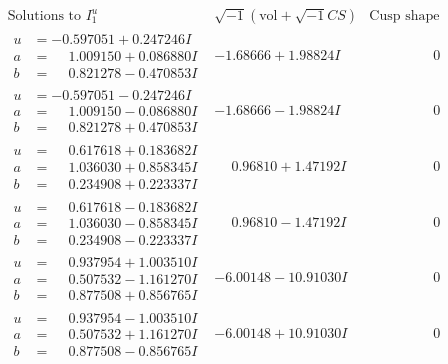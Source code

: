 \documentclass[1p]{elsarticle_modified}
\theoremstyle{definition}
\newcommand{\I}{\sqrt{-1}}
\begin{document}
$$\begin{array}{c|c|c}
\text{Solutions to }I^u_{1}& \I (\text{vol} + \sqrt{-1}CS) & \text{Cusp shape}\\
 \hline 
\begin{aligned}
u &= -0.597051 + 0.247246 I \\
a &= \phantom{-}1.009150 + 0.086880 I \\
b &= \phantom{-}0.821278 - 0.470853 I\end{aligned}
 & -1.68666 + 1.98824 I & \phantom{-0.000000 } 0 \\ \hline\begin{aligned}
u &= -0.597051 - 0.247246 I \\
a &= \phantom{-}1.009150 - 0.086880 I \\
b &= \phantom{-}0.821278 + 0.470853 I\end{aligned}
 & -1.68666 - 1.98824 I & \phantom{-0.000000 } 0 \\ \hline\begin{aligned}
u &= \phantom{-}0.617618 + 0.183682 I \\
a &= \phantom{-}1.036030 + 0.858345 I \\
b &= \phantom{-}0.234908 + 0.223337 I\end{aligned}
 & \phantom{-}0.96810 + 1.47192 I & \phantom{-0.000000 } 0 \\ \hline\begin{aligned}
u &= \phantom{-}0.617618 - 0.183682 I \\
a &= \phantom{-}1.036030 - 0.858345 I \\
b &= \phantom{-}0.234908 - 0.223337 I\end{aligned}
 & \phantom{-}0.96810 - 1.47192 I & \phantom{-0.000000 } 0 \\ \hline\begin{aligned}
u &= \phantom{-}0.937954 + 1.003510 I \\
a &= \phantom{-}0.507532 - 1.161270 I \\
b &= \phantom{-}0.877508 + 0.856765 I\end{aligned}
 & -6.00148 - 10.91030 I & \phantom{-0.000000 } 0 \\ \hline\begin{aligned}
u &= \phantom{-}0.937954 - 1.003510 I \\
a &= \phantom{-}0.507532 + 1.161270 I \\
b &= \phantom{-}0.877508 - 0.856765 I\end{aligned}
 & -6.00148 + 10.91030 I & \phantom{-0.000000 } 0 \\ \hline\begin{aligned}

\end{aligned}
\end{array}$$
\end{document}
